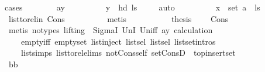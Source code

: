 \begin{isabellebody}
{\isacharparenleft}{\kern0pt}cases{\isacharparenright}{\kern0pt}\isanewline
\ \ \ \ \ \ \isamarkupfalse%
\ ay\isanewline
\ \ \ \ \ \ \isamarkupfalse%
\ \isamarkupfalse%
\ {\isachardoublequoteopen}y\ {\isacharequal}{\kern0pt}\ hd\ ls{\isachardoublequoteclose}\ \isamarkupfalse%
\ {}\ \isamarkupfalse%
\ auto\isanewline
\ \ \ \ \ \ \isamarkupfalse%
\ \isamarkupfalse%
\ {\isachardoublequoteopen}x\ {\isasymin}\ set\ {\isacharparenleft}{\kern0pt}a\ {\isacharhash}{\kern0pt}\ ls{}{\isacharparenright}{\kern0pt}{\isachardoublequoteclose}\ \isamarkupfalse%
\ list{\isacharunderscore}{\kern0pt}to{\isacharunderscore}{\kern0pt}rel{\isacharunderscore}{\kern0pt}in\ Cons\isanewline
\ \ \ \ \ \ \ \ \isamarkupfalse%
\ metis\ \isanewline
\ \ \ \ \ \ \isamarkupfalse%
\ \isamarkupfalse%
\ {\isacharquery}{\kern0pt}thesis\ \ \isamarkupfalse%
\ \ Cons\isanewline
\ \ \ \ \ \ \ \ \isamarkupfalse%
\ {\isacharparenleft}{\kern0pt}metis\ {\isacharparenleft}{\kern0pt}no{\isacharunderscore}{\kern0pt}types{\isacharcomma}{\kern0pt}\ lifting{\isacharparenright}{\kern0pt}\ {\isachardoublequoteopen}{}{\isachardoublequoteclose}\ SigmaI\ UnI{}\ Un{\isacharunderscore}{\kern0pt}iff\ ay\ calculation\ \isanewline
\ \ \ \ empty{\isacharunderscore}{\kern0pt}iff\ empty{\isacharunderscore}{\kern0pt}set\ list{\isachardot}{\kern0pt}inject\ list{\isachardot}{\kern0pt}sel{\isacharparenleft}{\kern0pt}{}{\isacharparenright}{\kern0pt}\ list{\isachardot}{\kern0pt}sel{\isacharparenleft}{\kern0pt}{}{\isacharparenright}{\kern0pt}\ list{\isachardot}{\kern0pt}set{\isacharunderscore}{\kern0pt}intros{\isacharparenleft}{\kern0pt}{}{\isacharparenright}{\kern0pt}\ \isanewline
\ \ \ \ list{\isachardot}{\kern0pt}simps{\isacharparenleft}{\kern0pt}{}{}{\isacharparenright}{\kern0pt}\ list{\isacharunderscore}{\kern0pt}to{\isacharunderscore}{\kern0pt}rel{\isachardot}{\kern0pt}elims\ not{\isacharunderscore}{\kern0pt}Cons{\isacharunderscore}{\kern0pt}self{}\ set{\isacharunderscore}{\kern0pt}ConsD\ \ top{\isacharunderscore}{\kern0pt}insert{\isacharunderscore}{\kern0pt}set{\isacharparenright}{\kern0pt}\ \isanewline
\ \ \ \ \isamarkupfalse%
\isanewline
\ \ \ \ \ \ \isamarkupfalse%
\ bb\isanewline
\ \ \ \ \ \ \isamarkupfalse%
\ \isamarkupfalse%

\end{isabellebody}

